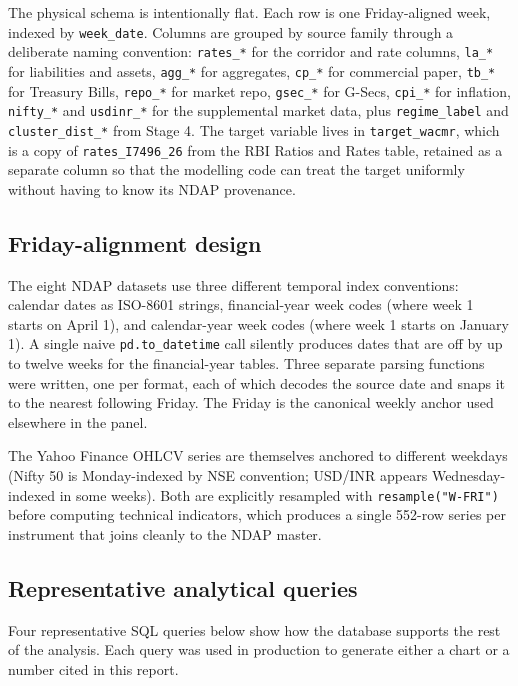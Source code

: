 The physical schema is intentionally flat. Each row is one Friday-aligned
week, indexed by \texttt{week\_date}. Columns are grouped by source
family through a deliberate naming convention: \texttt{rates\_*} for
the corridor and rate columns, \texttt{la\_*} for liabilities and
assets, \texttt{agg\_*} for aggregates, \texttt{cp\_*} for commercial
paper, \texttt{tb\_*} for Treasury Bills, \texttt{repo\_*} for market
repo, \texttt{gsec\_*} for G-Secs, \texttt{cpi\_*} for inflation,
\texttt{nifty\_*} and \texttt{usdinr\_*} for the supplemental market
data, plus \texttt{regime\_label} and \texttt{cluster\_dist\_*} from
Stage 4. The target variable lives in \texttt{target\_wacmr}, which is
a copy of \texttt{rates\_I7496\_26} from the RBI Ratios and Rates
table, retained as a separate column so that the modelling code can
treat the target uniformly without having to know its NDAP provenance.

\subsection{Friday-alignment design}

The eight NDAP datasets use three different temporal index conventions:
calendar dates as ISO-8601 strings, financial-year week codes (where
week 1 starts on April 1), and calendar-year week codes (where week 1
starts on January 1). A single naive \texttt{pd.to\_datetime} call
silently produces dates that are off by up to twelve weeks for the
financial-year tables. Three separate parsing functions were written,
one per format, each of which decodes the source date and snaps it to
the nearest following Friday. The Friday is the canonical weekly
anchor used elsewhere in the panel.

The Yahoo Finance OHLCV series are themselves anchored to different
weekdays (Nifty 50 is Monday-indexed by NSE convention; USD/INR
appears Wednesday-indexed in some weeks). Both are explicitly
resampled with \texttt{resample("W-FRI")} before computing technical
indicators, which produces a single 552-row series per instrument that
joins cleanly to the NDAP master.

\subsection{Representative analytical queries}

Four representative SQL queries below show how the database supports
the rest of the analysis. Each query was used in production to
generate either a chart or a number cited in this report.

